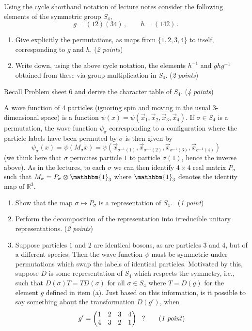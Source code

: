 \documentclass[12pt]{article}
\newcommand{\defem}[1]{{\em #1\/}}
\newcounter{alplisti}
\renewcommand{\thealplisti}{\alph{alplisti}}
\newenvironment{alplist}[1][(\thealplisti)]{\begin{list}{{\rm #1}\ }{ %
      \usecounter{alplisti} %
    \setlength{\itemsep}{0pt}
    \setlength{\parsep}{0pt}  %
     \setlength{\topsep}{0pt} %
}}{\end{list}}
\newcommand{\R} {\mathbb{R}}
\begin{document}
\begin{alplist}
 \item Using the cycle shorthand notation of lecture notes 
 consider the following elements of the symmetric group $S_4$,
 \[
  g = (12)(34)\,, \qquad h = (142)\,.
 \]
 \begin{enumerate}
  \item Give explicitly the permutations, as maps from $\{1,2,3,4\}$ to itself, corresponding to $g$ and $h$. \quad (\defem{2 points})
  \item 
 Write down, using the above cycle notation, the elements $h^{-1}$ and $g h g^{-1}$
 obtained from these via group multiplication in $S_4$. \quad (\defem{2 points})
 \end{enumerate}
 \item Recall Problem sheet 6 and derive the character table of $S_4$.  \quad (\defem{4 points})
 \item A wave function of $4$ particles (ignoring spin and moving in the usual $3$-dimensional space) is a function 
 $\psi(x)=\psi(\vec{x}_1,\vec{x}_2,\vec{x}_3,\vec{x}_4)$.  If $\sigma\in S_4$ is a permutation,
 the wave function $\psi_\sigma$ corresponding to a configuration where the particle labels 
 have been permuted by $\sigma$ is then given by 
 \[
\psi_\sigma(x) = \psi(M_\sigma x)= \psi(\vec{x}_{\sigma^{-1}(1)},\vec{x}_{\sigma^{-1}(2)},\vec{x}_{\sigma^{-1}(3)},\vec{x}_{\sigma^{-1}(4)})
 \]
 (we think here that $\sigma$ permutes particle $1$ to particle $\sigma(1)$, hence the inverse above).  As in the lectures, to each $\sigma$
 we can then identify $4\times 4$ real matrix $P_\sigma$ such that $M_\sigma=P_\sigma \otimes \mathbbm{1}_3$ where $\mathbbm{1}_3$ denotes the identity map of $\R^3$.
 \begin{enumerate}
  \item 
 Show that the map $\sigma \mapsto P_\sigma$ is a representation 
 of $S_4$.  \ (\defem{1 point})
 \item
 Perform the decomposition of the representation into irreducible unitary representations.
  \quad (\defem{2 points})
 \item Suppose particles $1$ and $2$ are identical bosons, as are particles $3$ and $4$, but of a different species.  Then the wave function $\psi$ must be symmetric under permutations which swap the labels of identical particles.   Motivated by this, suppose $D$ is some representation of $S_4$ which respects the symmetry, i.e., such that 
 $D(\sigma) T=T D(\sigma)$ for all $\sigma\in S_4$ where $T=D(g)$ for the element $g$ defined in item (a).  Just based on this information, is it possible to say something about
 the transformation $D(g')$, when
  \[
 g'= \begin{pmatrix}
   1 & 2 & 3 & 4 \\ 4 & 3 & 2 & 1
  \end{pmatrix} \ \ \, ? \qquad \text{(\defem{1 point})}
 \]
 \end{enumerate}
\end{alplist}
\end{document}
